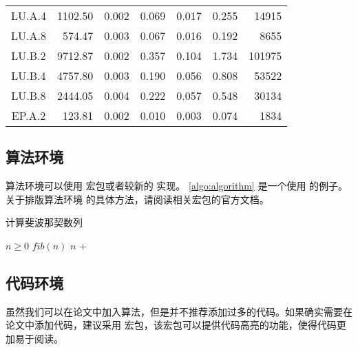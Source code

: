 \begin{ThreePartTable}
\begin{longtable}[c]{c*{6}{r}}
    LU.A.4                 & 1102.50                             & 0.002                               & 0.069          & 0.017 & 0.255 & 14915  \\
    LU.A.8                 & 574.47                              & 0.003                               & 0.067          & 0.016 & 0.192 & 8655   \\
    LU.B.2                 & 9712.87                             & 0.002                               & 0.357          & 0.104 & 1.734 & 101975 \\
    LU.B.4                 & 4757.80                             & 0.003                               & 0.190          & 0.056 & 0.808 & 53522  \\
    LU.B.8                 & 2444.05                             & 0.004                               & 0.222          & 0.057 & 0.548 & 30134  \\
    EP.A.2                 & 123.81                              & 0.002                               & 0.010          & 0.003 & 0.074 & 1834   \\
    \bottomrule
  \end{longtable}
\end{ThreePartTable}



\subsection{算法环境}

算法环境可以使用  宏包或者较新的  实现。
\ref{algo:algorithm} 是一个使用  的例子。关于排版算法环境
的具体方法，请阅读相关宏包的官方文档。

\begin{algorithm}
  \caption{计算斐波那契数列}\label{algo:algorithm}
  \begin{algorithmic}[1]
    \Require $n \geq 0$
    \Ensure $fib(n)$
    \State \Return $n$
    \Else
    \State \Return {} + 
    \EndIf
    \EndFunction
  \end{algorithmic}
\end{algorithm}

\subsection{代码环境}

虽然我们可以在论文中加入算法，但是并不推荐添加过多的代码。如果确实需要在论文中添加代码，建议采用  宏包，该宏包可以提供代码高亮的功能，使得代码更加易于阅读。

